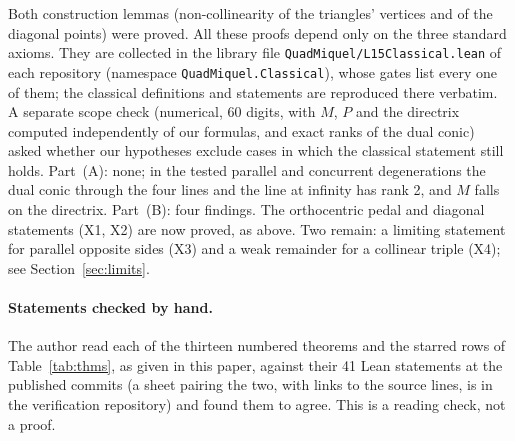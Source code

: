 \documentclass[11pt]{article}
\theoremstyle{definition}
\theoremstyle{remark}
\newcommand{\lean}[1]{\texttt{#1}}
\begin{document}
Both construction lemmas (non-collinearity of the triangles' vertices and of the diagonal points) were
proved. All these proofs depend only on the three standard axioms. They are collected in the library
file \lean{QuadMiquel/L15Classical.lean} of each repository (namespace \lean{QuadMiquel.Classical}),
whose gates list every one of them; the classical definitions and statements are reproduced there verbatim.
A separate scope check (numerical, 60 digits, with $M$, $P$ and the directrix computed independently of
our formulas, and exact ranks of the dual conic) asked whether our hypotheses exclude cases in which the
classical statement still holds. Part~(A): none; in the tested parallel and concurrent degenerations the dual
conic through the four lines and the line at infinity has rank 2, and $M$ falls on the directrix. Part~(B):
four findings. The orthocentric pedal and diagonal statements (X1, X2) are now proved, as above. Two
remain: a limiting statement for parallel opposite sides (X3) and a weak remainder for a collinear
triple (X4); see Section~\ref{sec:limits}.

\paragraph{Statements checked by hand.} The author read each of the thirteen numbered theorems and the starred rows of Table~\ref{tab:thms}, as given in this paper, against their 41 Lean statements at the published commits (a sheet pairing the two, with links to the source lines, is in the verification repository) and found them to agree. This is a reading check, not a proof.
\end{document}
